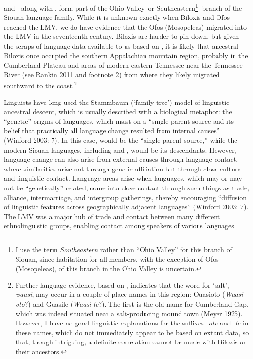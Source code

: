 \documentclass[output=paper]{LSP/langsci}
\begin{document}
 and , along with , form part of the Ohio Valley, or Southeastern\footnote{I use the term \emph{Southeastern} rather than “Ohio Valley” for this branch of Siouan, since habitation for all members, with the exception of Ofos (Mosopeleas), of this branch in the Ohio Valley is uncertain.}, branch of the Siouan language family. While it is unknown exactly when Biloxis and Ofos reached the LMV, we do have evidence that the Ofos (Mosopeleas) migrated into the LMV in the seventeenth century. Biloxis are harder to pin down, but given the scraps of language data available to us based on , it is likely that ancestral Biloxis once occupied the southern Appalachian mountain region, probably in the Cumberland Plateau and areas of modern eastern Tennessee near the Tennessee River (see Rankin 2011 and footnote \ref{waasi}) from where they likely migrated southward to the  coast.\footnote{\label{waasi}Further language evidence, based on , indicates that the  word for `salt', \emph{waasi}, may occur in a couple of place names in this region: Ouasioto (\emph{Waasi-oto}?) and Guasile (\emph{Waasi-le}?). The first is the old name for Cumberland Gap, which was indeed situated near a salt-producing mound town (Meyer 1925). However, I have no good linguistic explanations for the suffixes \emph{-oto} and \emph{-le} in these names, which do not immediately appear to be  based on extant data, so that, though intriguing, a definite correlation cannot be made with Biloxis or their ancestors.}

Linguists have long used the Stammbaum (`family tree') model of linguistic ancestral descent, which is usually described with a biological metaphor: the “genetic” origins of languages, which insist on a “single-parent source and its belief that practically all language change resulted from internal causes” (Winford 2003: 7). In this case,  would be the “single-parent source,” while the modern Siouan languages, including  and , would be its descendants. However, language change can also arise from external causes through language contact, where similarities arise not through genetic affiliation but through close cultural and linguistic contact. Language areas arise when languages, which may or may not be “genetically” related, come into close contact through such things as trade, alliance, intermarriage, and intergroup gatherings, thereby encouraging “diffusion of linguistic features across geographically adjacent languages” (Winford 2003: 7). The LMV was a major hub of trade and contact between many different ethnolinguistic groups, enabling contact among speakers of various languages. 
\end{document}
